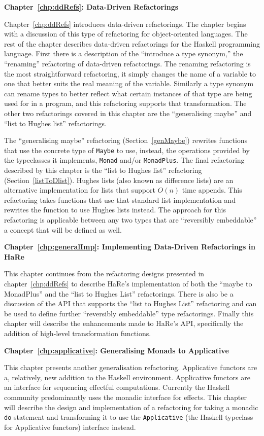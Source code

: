 \textbf{Chapter~\ref{chp:ddRefs}: Data-Driven Refactorings}

Chapter~\ref{chp:ddRefs} introduces data-driven refactorings. The chapter begins with a discussion of this type of refactoring for object-oriented languages. The rest of the chapter describes data-driven refactorings for the Haskell programming language. First there is a description of the ``introduce a type synonym,'' the ``renaming'' refactoring of data-driven refactorings. The renaming refactoring is the most straightforward refactoring, it simply changes the name of a variable to one that better suits the real meaning of the variable. Similarly a type synonym can rename types to better reflect what certain instances of that type are being used for in a program, and this refactoring supports that transformation. The other two refactorings covered in this chapter are the ``generalising maybe'' and ``list to Hughes list'' refactorings.

The ``generalising maybe'' refactoring (Section~\ref{genMaybe}) rewrites functions that use the concrete type of \texttt{Maybe} to use, instead, the operations provided by the typeclasses it implements, \texttt{Monad} and/or \texttt{MonadPlus}. The final refactoring described by this chapter is the ``list to Hughes list'' refactoring (Section~\ref{listToDlist}). Hughes lists (also known as difference lists) are an alternative implementation for lists that support $O(n)$ time appends. This refactoring takes functions that use that standard list implementation and rewrites the function to use Hughes lists instead. The approach for this refactoring is applicable between any two types that are ``reversibly embeddable'' a concept that will be defined as well.

\textbf{Chapter~\ref{chp:generalImp}: Implementing Data-Driven Refactorings in HaRe}

This chapter continues from the refactoring designs presented in chapter~\ref{chp:ddRefs} to describe HaRe's implementation of both the ``maybe to MonadPlus'' and the ``list to Hughes List'' refactorings. There is also be a discussion of the API that  supports the ``list to Hughes List'' refactoring and can be used to define further ``reversibly embeddable'' type refactorings. Finally this chapter will describe the enhancements made to HaRe's API, specifically the addition of high-level transformation functions.

\textbf{Chapter~\ref{chp:applicative}: Generalising Monads to Applicative}

This chapter presents another generalisation refactoring. Applicative functors are a, relatively, new addition to the Haskell environment. Applicative functors are an interface for sequencing effectful computations. Currently the Haskell community predominantly uses the monadic interface for effects. This chapter will describe the design and implementation of a refactoring for taking a monadic \texttt{do} statement and transforming it to use the \texttt{Applicative} (the Haskell typeclass for Applicative functors) interface instead.

